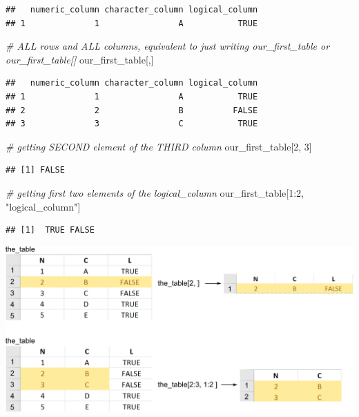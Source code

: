 \documentclass[
]{book}
\newenvironment{Shaded}{\begin{snugshade}}{\end{snugshade}}
\newcommand{\CommentTok}[1]{\textcolor[rgb]{0.56,0.35,0.01}{\textit{#1}}}
\newcommand{\DecValTok}[1]{\textcolor[rgb]{0.00,0.00,0.81}{#1}}
\newcommand{\NormalTok}[1]{#1}
\newcommand{\SpecialCharTok}[1]{\textcolor[rgb]{0.00,0.00,0.00}{#1}}
\newcommand{\StringTok}[1]{\textcolor[rgb]{0.31,0.60,0.02}{#1}}
\begin{document}
\begin{verbatim}
##   numeric_column character_column logical_column
## 1              1                A           TRUE
\end{verbatim}

\begin{Shaded}
\begin{Highlighting}[]
\CommentTok{\# ALL rows and ALL columns, equivalent to just writing \textasciigrave{}our\_first\_table\textasciigrave{} or \textasciigrave{}our\_first\_table[]\textasciigrave{}}
\NormalTok{our\_first\_table[,]}
\end{Highlighting}
\end{Shaded}

\begin{verbatim}
##   numeric_column character_column logical_column
## 1              1                A           TRUE
## 2              2                B          FALSE
## 3              3                C           TRUE
\end{verbatim}

\begin{Shaded}
\begin{Highlighting}[]
\CommentTok{\# getting SECOND element of the THIRD column}
\NormalTok{our\_first\_table[}\DecValTok{2}\NormalTok{, }\DecValTok{3}\NormalTok{]}
\end{Highlighting}
\end{Shaded}

\begin{verbatim}
## [1] FALSE
\end{verbatim}

\begin{Shaded}
\begin{Highlighting}[]
\CommentTok{\# getting first two elements of the logical\_column}
\NormalTok{our\_first\_table[}\DecValTok{1}\SpecialCharTok{:}\DecValTok{2}\NormalTok{, }\StringTok{"logical\_column"}\NormalTok{]}
\end{Highlighting}
\end{Shaded}

\begin{verbatim}
## [1]  TRUE FALSE
\end{verbatim}

\begin{center}\includegraphics[width=1\linewidth]{images/table-rows-columns} \end{center}
\end{document}
